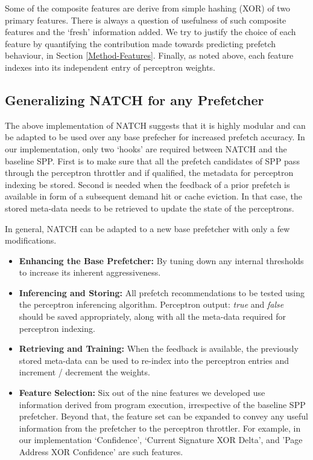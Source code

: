 Some of the composite features are derive from simple hashing (XOR) of
two primary features.  There is always a question of usefulness of
such composite features and the `fresh' information added.  We try to
justify the choice of each feature by quantifying the contribution
made towards predicting prefetch behaviour, in Section \ref{Method-Features}.  Finally,
as noted above, each feature indexes into its independent entry of
perceptron weights.

\subsection{Generalizing NATCH for any Prefetcher}
\label{Design-Generalizing}
The above implementation of NATCH suggests that it is highly modular and can be 
adapted to be used over any base prefecher for increased prefetch accuracy. 
In our implementation, 
only two `hooks' are required between NATCH and the baseline SPP. First  
is to make sure that all the prefetch candidates of SPP pass through 
the perceptron throttler and if qualified, the metadata for perceptron indexing
be stored. Second is needed when the feedback of a prior prefetch is available in form 
of a subsequent demand hit or cache eviction. In that case, the stored meta-data needs 
to be retrieved to update the state of the perceptrons.

In general, NATCH can be adapted to a new base prefetcher with only a few modifications.
\begin{itemize}

\item \textbf{Enhancing the Base Prefetcher:} By tuning down any internal thresholds 
to increase its inherent aggressiveness. 

\item \textbf{Inferencing and Storing:} All prefetch recommendations to be tested 
using the perceptron inferencing algorithm.
Perceptron output: \textit{true} and \textit{false} should be saved appropriately, along with all 
the meta-data required for perceptron indexing.

\item \textbf{Retrieving and Training:} When the feedback is available, the previously 
stored meta-data can be used to re-index into the perceptron entries and increment / decrement 
the weights.

\item \textbf{Feature Selection:} Six out of the nine features we developed use information derived 
from program execution, irrespective of the baseline SPP prefetcher. Beyond that, the feature set 
can be expanded to convey any useful information from the prefetcher to the perceptron throttler.
For example, in our implementation `Confidence', `Current Signature XOR Delta', and 
'Page Address XOR Confidence' are such features.

\end{itemize}

